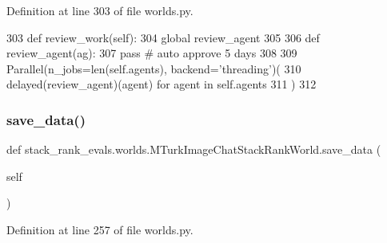 Definition at line 303 of file worlds.\+py.


\begin{DoxyCode}
303     \textcolor{keyword}{def }review\_work(self):
304         \textcolor{keyword}{global} review\_agent
305 
306         \textcolor{keyword}{def }review\_agent(ag):
307             \textcolor{keywordflow}{pass}  \textcolor{comment}{# auto approve 5 days}
308 
309         Parallel(n\_jobs=len(self.agents), backend=\textcolor{stringliteral}{'threading'})(
310             delayed(review\_agent)(agent) \textcolor{keywordflow}{for} agent \textcolor{keywordflow}{in} self.agents
311         )
312 
\end{DoxyCode}
\mbox{\label{classstack__rank__evals_1_1worlds_1_1MTurkImageChatStackRankWorld_a54a526f54b82c3de45d3d2edad9a6658}} 
\subsubsection{\texorpdfstring{save\+\_\+data()}{save\_data()}}
{\footnotesize\ttfamily def stack\+\_\+rank\+\_\+evals.\+worlds.\+M\+Turk\+Image\+Chat\+Stack\+Rank\+World.\+save\+\_\+data (\begin{DoxyParamCaption}\item[{}]{self }\end{DoxyParamCaption})}



Definition at line 257 of file worlds.\+py.


